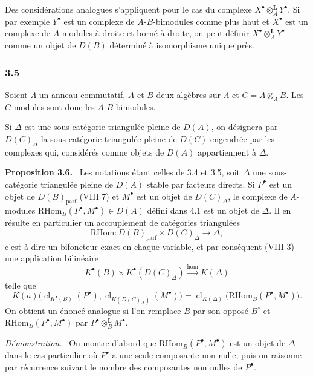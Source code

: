 \documentclass[11pt]{article}
\newenvironment{statement}[1]{\par\medskip\noindent\textbf{#1.}\ }{\par\medskip}
\newenvironment{prooftext}[1][Proof]{\par\noindent\emph{#1.}\ }{\par\medskip}
\providecommand{\RHom}{\mathrm{RHom}}
\providecommand{\cl}{\operatorname{cl}}
\providecommand{\parf}{\mathrm{parf}}
\providecommand{\RHom}{\mathrm{RHom}}
\providecommand{\RHom}{\mathrm R\mathcal{H}om}
\providecommand{\cl}{\operatorname{cl}}
\providecommand{\parf}{\mathrm{parf}}
\providecommand{\RHom}{\mathrm{RHom}}
\providecommand{\cl}{\operatorname{cl}}
\begin{document}
Des considérations analogues s'appliquent pour le cas du complexe $X^\bullet\otimes_A^{\mathbf L}Y^\bullet$. Si par exemple $Y^\bullet$ est un complexe de $A$-$B$-bimodules comme plus haut et $X^\bullet$ est un complexe de $A$-modules à droite et borné à droite, on peut définir $X^\bullet\otimes_A^{\mathbf L}Y^\bullet$ comme un objet de $D(B)$ déterminé à isomorphisme unique près.

\subsubsection*{3.5}

Soient $\Lambda$ un anneau commutatif, $A$ et $B$ deux algèbres sur $\Lambda$ et $C=A\otimes_{\Lambda}B$. Les $C$-modules sont donc les $A$-$B$-bimodules.

Si $\Delta$ est une sous-catégorie triangulée pleine de $D(A)$, on désignera par $D(C)_{\Delta}$ la sous-catégorie triangulée pleine de $D(C)$ engendrée par les complexes qui, considérés comme objets de $D(A)$ appartiennent à $\Delta$.

\begin{statement}{Proposition 3.6}
Les notations étant celles de 3.4 et 3.5, soit $\Delta$ une sous-catégorie triangulée pleine de $D(A)$ stable par facteurs directs. Si $P^\bullet$ est un objet de $D(B)_{\parf}$ (VIII 7) et $M^\bullet$ est un objet de $D(C)_{\Delta}$, le complexe de $A$-modules $\RHom_B(P^\bullet,M^\bullet)\in D(A)$ défini dans 4.1 est un objet de $\Delta$. Il en résulte en particulier un accouplement de catégories triangulées
\[
\RHom:D(B)_{\parf}\times D(C)_{\Delta}\longrightarrow \Delta,
\tag{3.6.1}
\]
c'est-à-dire un bifoncteur exact en chaque variable, et par conséquent (VIII 3) une application bilinéaire
\[
K^{\bullet}(B)\times K^{\bullet}(D(C)_{\Delta})\xrightarrow{\operatorname{hom}} K(\Delta)
\tag{3.6.2}
\]
telle que
\[
K(a)\bigl(\cl_{K^{\bullet}(B)}(P^\bullet),\cl_{K(D(C)_{\Delta})}(M^\bullet)\bigr)
=\cl_{K(\Delta)}\bigl(\RHom_B(P^\bullet,M^\bullet)\bigr).
\tag{3.6.3}
\]
On obtient un énoncé analogue si l'on remplace $B$ par son opposé $B^\circ$ et $\RHom_B(P^\bullet,M^\bullet)$ par $P^\bullet\otimes_B^{\mathbf L}M^\bullet$.
\end{statement}

\begin{prooftext}[Démonstration]
On montre d'abord que $\RHom_B(P^\bullet,M^\bullet)$ est un objet de $\Delta$ dans le cas particulier où $P^\bullet$ a une seule composante non nulle, puis on raisonne par récurrence suivant le nombre des composantes non nulles de $P^\bullet$.
\end{prooftext}
\end{document}
